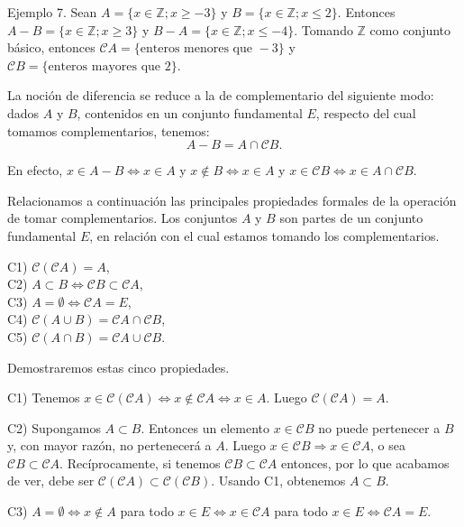 \documentclass[12pt,oneside]{book}
\begin{document}
Ejemplo 7. Sean \( A = \{x \in \mathbb{Z}; x \geq -3\} \) y \( B = \{x \in \mathbb{Z}; x \leq 2\} \). Entonces \( A - B = \{x \in \mathbb{Z}; x \geq 3\} \) y \( B - A = \{x \in \mathbb{Z}; x \leq -4\} \). Tomando \(\mathbb{Z}\) como conjunto básico, entonces \( \mathcal{C}A = \{\text{enteros menores que } -3\} \) y \( \mathcal{C}B = \{\text{enteros mayores que } 2\} \).

La noción de diferencia se reduce a la de complementario del siguiente modo: dados \( A \) y \( B \), contenidos en un conjunto fundamental \( E \), respecto del cual tomamos complementarios, tenemos:
\[
A - B = A \cap \mathcal{C}B.
\]

En efecto, \( x \in A - B \Leftrightarrow x \in A \) y \( x \notin B \Leftrightarrow x \in A \) y \( x \in \mathcal{C}B \Leftrightarrow x \in A \cap \mathcal{C}B \).

Relacionamos a continuación las principales propiedades formales de la operación de tomar complementarios. Los conjuntos \( A \) y \( B \) son partes de un conjunto fundamental \( E \), en relación con el cual estamos tomando los complementarios.

C1) \( \mathcal{C}(\mathcal{C}A) = A \),\\
C2) \( A \subset B \Leftrightarrow \mathcal{C}B \subset \mathcal{C}A \),\\
C3) \( A = \emptyset \Leftrightarrow \mathcal{C}A = E \),\\
C4) \( \mathcal{C}(A \cup B) = \mathcal{C}A \cap \mathcal{C}B \),\\
C5) \( \mathcal{C}(A \cap B) = \mathcal{C}A \cup \mathcal{C}B \).

Demostraremos estas cinco propiedades.

C1) Tenemos \( x \in \mathcal{C}(\mathcal{C}A) \Leftrightarrow x \notin \mathcal{C}A \Leftrightarrow x \in A \). Luego \( \mathcal{C}(\mathcal{C}A) = A \).

C2) Supongamos \( A \subset B \). Entonces un elemento \( x \in \mathcal{C}B \) no puede pertenecer a \( B \) y, con mayor razón, no pertenecerá a \( A \). Luego \( x \in \mathcal{C}B \Rightarrow x \in \mathcal{C}A \), o sea \( \mathcal{C}B \subset \mathcal{C}A \). Recíprocamente, si tenemos \( \mathcal{C}B \subset \mathcal{C}A \) entonces, por lo que acabamos de ver, debe ser \( \mathcal{C}(\mathcal{C}A) \subset \mathcal{C}(\mathcal{C}B) \). Usando C1, obtenemos \( A \subset B \).

C3) \( A = \emptyset \Leftrightarrow x \notin A \) para todo \( x \in E \Leftrightarrow x \in \mathcal{C}A \) para todo \( x \in E \Leftrightarrow \mathcal{C}A = E \).
\end{document}
